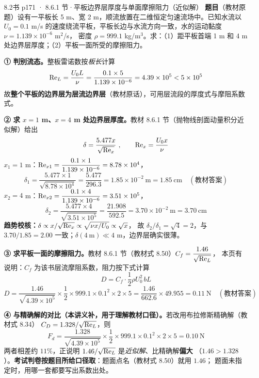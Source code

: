 \begin{liti}{8.2}{书 p171 · 8.6.1 节·平板边界层厚度与单面摩擦阻力（近似解）}
\textbf{题目}（教材原题）设有一平板长 5 m、宽 2 m，顺流放置在二维恒定匀速流场中。已知水流以
$U_0=0.1$ m/s 的速度绕流平板，平板长边与水流方向一致，水的运动黏度 $\nu=1.139\times10^{-6}$ m$^2$/s，
密度 $\rho=999.1$ kg/m$^3$。求：（1）距平板首端 1 m 和 4 m 处边界层厚度；（2）平板一面所受的摩擦阻力。


\begin{jie}
\textbf{① 判别流态。}整板雷诺数按\emph{板长}计算
\[ \mathrm{Re}_L=\frac{U_0L}{\nu}=\frac{0.1\times5}{1.139\times10^{-6}}=4.39\times10^{5}<5\times10^{5} \]
故\textbf{整个平板的边界层为层流边界层}（教材原话），可用层流段的厚度式与摩阻系数式。

\textbf{② 求 $x=1$ m、$x=4$ m 处边界层厚度。}教材 8.6.1 节（抛物线剖面动量积分近似解）给出
\[ \delta=\frac{5.477x}{\sqrt{\Rey_x}}\ ,\qquad \Rey_x=\frac{U_0x}{\nu} \]
$x_1=1$ m：$\mathrm{Re}_{x1}=\dfrac{0.1\times1}{1.139\times10^{-6}}=8.78\times10^{4}$，
\[ \delta_1=\frac{5.477\times1}{\sqrt{8.78\times10^{4}}}=\frac{5.477}{296.3}=1.85\times10^{-2}\ \mathrm{m}=1.85\ \mathrm{cm}
   \quad(\text{教材答案}) \]
$x_2=4$ m：$\mathrm{Re}_{x2}=\dfrac{0.1\times4}{1.139\times10^{-6}}=3.51\times10^{5}$，
\[ \delta_2=\frac{5.477\times4}{\sqrt{3.51\times10^{5}}}=\frac{21.908}{592.5}=3.70\times10^{-2}\ \mathrm{m}=3.70\ \mathrm{cm} \]
\textbf{趋势校核：}$\delta\propto x/\sqrt{\mathrm{Re}_x}\propto\sqrt{\nu x/U_0}\propto\sqrt{x}$，
故 $\delta_2/\delta_1=\sqrt{4}=2$，与 $3.70/1.85=2.00$ 一致；$\delta(4\ \mathrm{m})\ll4$ m，边界层确实很薄。

\textbf{③ 求平板一面的摩擦阻力。}教材 8.6.1 节（教材式 8.50）$C_f=\dfrac{1.46}{\sqrt{\mathrm{Re}_L}}$，
本页有说明：$C_f$ 为该书层流摩阻系数，阻力按下式计算
\[ D=C_f\cdot\frac{1}{2}\rho U_0^2\,bL \]
\[ D=\frac{1.46}{\sqrt{4.39\times10^{5}}}\times\frac{1}{2}\times999.1\times0.1^2\times2\times5
   =\frac{1.46}{662.6}\times49.955=0.11\ \mathrm{N}\quad(\text{教材答案}) \]

\textbf{④ 与精确解的对比（本讲义补，用于理解教材口径）。}若改用布拉修斯精确解（教材式 8.34）
$C_D=1.328/\sqrt{\mathrm{Re}_L}$，则
\[ F_d=\frac{1.328}{\sqrt{4.39\times10^{5}}}\times\frac{1}{2}\times999.1\times0.1^2\times2\times5=0.10\ \mathrm{N} \]
两者相差约 $11\%$，正说明 $1.46/\sqrt{\mathrm{Re}_L}$ 是\emph{近似解}、比精确解\textbf{偏大}
（$1.46>1.328$）。\textbf{考试判卷按题目所给口径取}：题面点名（教材式 8.50）就用 $1.46$；
题面未指定时，用哪一套都要写出系数出处。
\end{jie}


\end{liti}

